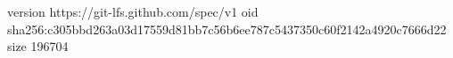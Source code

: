 version https://git-lfs.github.com/spec/v1
oid sha256:c305bbd263a03d17559d81bb7c56b6ee787c5437350c60f2142a4920c7666d22
size 196704
